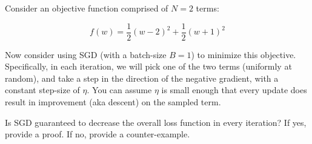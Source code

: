 
Consider an objective function comprised of $N=2$ terms:

\begin{equation}
f(w) = \frac{1}{2} (w-2)^2 + \frac{1}{2}(w+1)^2
\end{equation}

Now consider using SGD (with a batch-size $B=1$) to minimize this objective. Specifically, in each iteration,
we will pick one of the two terms (uniformly at random), and take a step in the direction of the negative gradient, with a constant
step-size of $\eta$.
You can assume $\eta$ is small enough that every update does result in improvement (aka descent) on the sampled term.

Is SGD guaranteed to decrease the overall loss function in every iteration? If yes, provide a proof. If no, provide a counter-example.